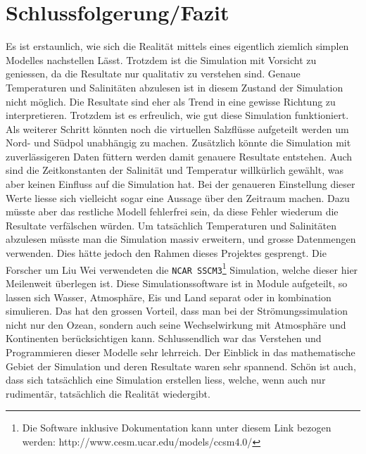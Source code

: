 \section{Schlussfolgerung/Fazit}

Es ist erstaunlich, wie sich die Realität mittels eines eigentlich ziemlich simplen Modelles nachstellen Lässt. Trotzdem ist die Simulation mit Vorsicht zu geniessen, da die Resultate nur qualitativ zu verstehen sind. Genaue Temperaturen und Salinitäten abzulesen ist in diesem Zustand der Simulation nicht möglich. Die Resultate sind eher als Trend in eine gewisse Richtung zu interpretieren. Trotzdem ist es erfreulich, wie gut diese Simulation funktioniert. 
Als weiterer Schritt könnten noch die virtuellen Salzflüsse aufgeteilt werden um Nord- und Südpol unabhängig zu machen. Zusätzlich könnte die Simulation mit zuverlässigeren Daten füttern werden damit genauere Resultate entstehen. Auch sind die Zeitkonstanten der Salinität und Temperatur willkürlich gewählt, was aber keinen Einfluss auf die Simulation hat. Bei der genaueren Einstellung dieser Werte liesse sich vielleicht sogar eine Aussage über den Zeitraum machen. Dazu müsste aber das restliche Modell fehlerfrei sein, da diese Fehler wiederum die Resultate verfälschen würden.
Um tatsächlich Temperaturen und Salinitäten abzulesen müsste man die Simulation massiv erweitern, und grosse Datenmengen verwenden. Dies hätte jedoch den Rahmen dieses Projektes gesprengt. 
Die Forscher um Liu Wei \cite{thermohalin:liuwei} verwendeten die \texttt{NCAR SSCM3}\footnote{Die Software inklusive Dokumentation kann unter diesem Link bezogen werden: http://www.cesm.ucar.edu/models/ccsm4.0/} Simulation, welche dieser hier Meilenweit überlegen ist. Diese Simulationssoftware ist in Module aufgeteilt, so lassen sich Wasser, Atmosphäre, Eis und Land separat oder in kombination simulieren. Das hat den grossen Vorteil, dass man bei der Strömungssimulation nicht nur den Ozean, sondern auch seine Wechselwirkung mit Atmosphäre und Kontinenten berücksichtigen kann. 
Schlussendlich war das Verstehen und Programmieren dieser Modelle sehr lehrreich. Der Einblick in das mathematische Gebiet der Simulation und deren Resultate waren sehr spannend. Schön ist auch, dass sich tatsächlich eine Simulation erstellen liess, welche, wenn auch nur rudimentär, tatsächlich die Realität wiedergibt.
